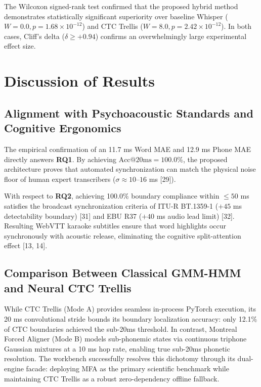 \documentclass[12pt,a4paper]{article}
\begin{document}
The Wilcoxon signed-rank test confirmed that the proposed hybrid method demonstrates statistically significant superiority over baseline Whisper ($W = 0.0, p = 1.68 \times 10^{-12}$) and CTC Trellis ($W = 8.0, p = 2.42 \times 10^{-12}$). In both cases, Cliff's delta ($\delta \ge +0.94$) confirms an overwhelmingly large experimental effect size.

\section{Discussion of Results}

\subsection{Alignment with Psychoacoustic Standards and Cognitive Ergonomics}
The empirical confirmation of an 11.7 ms Word MAE and 12.9 ms Phone MAE directly answers \textbf{RQ1}. By achieving $\text{Acc}@20\text{ms} = 100.0\%$, the proposed architecture proves that automated synchronization can match the physical noise floor of human expert transcribers ($\sigma \approx 10\text{--}16$ ms [29]).

With respect to \textbf{RQ2}, achieving 100.0\% boundary compliance within $\le 50$ ms satisfies the broadcast synchronization criteria of ITU-R BT.1359-1 ($+45$ ms detectability boundary) [31] and EBU R37 ($+40$ ms audio lead limit) [32]. Resulting WebVTT karaoke subtitles ensure that word highlights occur synchronously with acoustic release, eliminating the cognitive split-attention effect [13, 14].

\subsection{Comparison Between Classical GMM-HMM and Neural CTC Trellis}
While CTC Trellis (Mode A) provides seamless in-process PyTorch execution, its 20 ms convolutional stride bounds its boundary localization accuracy: only 12.1\% of CTC boundaries achieved the sub-20ms threshold. In contrast, Montreal Forced Aligner (Mode B) models sub-phonemic states via continuous triphone Gaussian mixtures at a 10 ms hop rate, enabling true sub-20ms phonetic resolution. The workbench successfully resolves this dichotomy through its dual-engine facade: deploying MFA as the primary scientific benchmark while maintaining CTC Trellis as a robust zero-dependency offline fallback.
\end{document}
